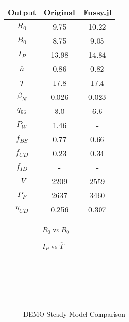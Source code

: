 \begin{table}[b!]
\begin{subtable}[t]{0.5\textwidth}
\begin{tabular}{ c|c|c }
Output           & Original         & Fussy.jl        \\
\hline
$R_{0}$          & 9.75             & 10.22           \\
$B_{0}$          & 8.75             & 9.05           \\
$I_{P}$          & 13.98            & 14.84           \\
$\overline n$    & 0.86             & 0.82          \\
$\overline T$    & 17.8             & 17.4           \\
$\beta_{N}$       & 0.026            & 0.023          \\
$q_{95}$         & 8.0              & 6.6           \\
$P_{W}$          & 1.46             & -            \\
$f_{BS}$         & 0.77             & 0.66           \\
$f_{CD}$         & 0.23             & 0.34           \\
$f_{ID}$         & -              & -             \\
$\volume$         & 2209           & 2559          \\
$P_{F}$          & 2637           & 3460          \\
$\eta_{CD}$      & 0.256            & 0.307           \\

\end{tabular}
\end{subtable}
\hfill
\hfill
\label{table:act_2}
\end{table}

\begin{figure*}[t!]
    \centering
    \hfill
    \begin{subfigure}[t]{0.45\textwidth}
        \centering
    \begin{adjustbox}{width=\textwidth}
      \Large
      
    \end{adjustbox}
        \caption{$R_0$ vs $B_0$}
    \end{subfigure}
    \hfill
    \begin{subfigure}[t]{0.45\textwidth}
        \centering
    \begin{adjustbox}{width=\textwidth}
      \Large
      
    \end{adjustbox}
        \caption{$I_P$ vs $\overline T$}
    \end{subfigure}
    \hfill \hfill ~\\ ~\\ ~\\
    \caption{DEMO Steady Model Comparison} ~\\
    \label{fig:demo_steady_comparison}
\end{figure*}


